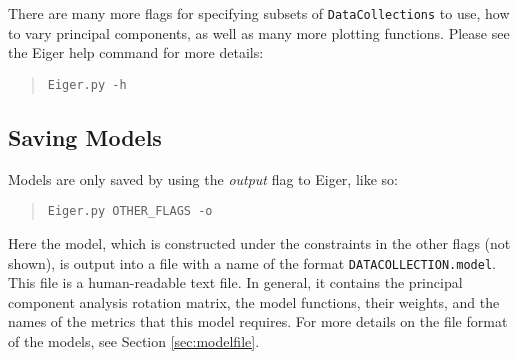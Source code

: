 There are many more flags for specifying subsets of \texttt{DataCollections} to use, how to vary principal components, as well as many more plotting functions. Please see the Eiger help command for more details:
	\begin{quote}
	\texttt{Eiger.py -h}
	\end{quote}

\subsection{Saving Models}
Models are only saved by using the {\em output} flag to Eiger, like so:
	\begin{quote}
	\texttt{Eiger.py OTHER\_FLAGS -o}
	\end{quote}
Here the model, which is constructed under the constraints in the other flags (not shown), is output into a file with a name of the format \texttt{DATACOLLECTION.model}. This file is a human-readable text file. In general, it contains the principal component analysis rotation matrix, the model functions, their weights, and the names of the metrics that this model requires. For more details on the file format of the models, see Section \ref{sec:modelfile}.

